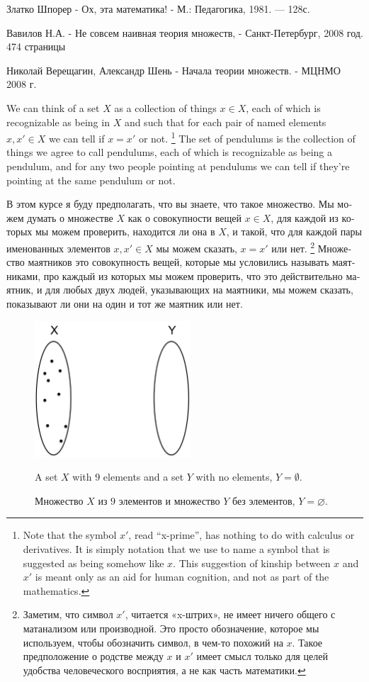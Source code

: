 \documentclass[a4paper]{book}
\theoremstyle{myth}
\begin{document}
\begin{russian}
{Златко Шпорер - Ох, эта математика! - М.: Педагогика, 1981. — 128с. 

Вавилов Н.А. - Не совсем наивная теория множеств, - Санкт-Петербург, 2008 год. 474 страницы
 
Николай Верещагин, Александр Шень - Начала теории множеств. - МЦНМО 2008 г.

} We can think of a set $X$ as a collection of things $x\in X$, each of which is recognizable as being in $X$ and such that for each pair of named elements $x,x'\in X$ we can tell if $x=x'$ or not.%
\footnote{Note that the symbol $x'$, read “x-prime”, has nothing to do with calculus or derivatives. It is simply notation that we use to name a symbol that is suggested as being somehow like $x$. This suggestion of kinship between $x$ and $x'$ is meant only as an aid for human cognition, and not as part of the mathematics.}
The set of pendulums is the collection of things we agree to call pendulums, each of which is recognizable as being a pendulum, and for any two people pointing at pendulums we can tell if they're pointing at the same pendulum or not. 

В этом курсе я буду предполагать, что вы знаете, что такое множество. Мы можем думать о множестве $X$ как о совокупности вещей $x\in X$, для каждой из которых мы можем проверить, находится ли она в $X$, и такой, что для каждой пары именованных элементов $x,x'\in X$ мы можем сказать, $x=x'$ или нет.%
\footnote{Заметим, что символ $x'$, читается «x-штрих», не имеет ничего общего с матанализом или производной. Это просто обозначение, которое мы используем, чтобы обозначить символ, в чем-то похожий на $x$. Такое предположение о родстве между $x$ и $x'$ имеет смысл только для целей удобства человеческого восприятия, а не как часть математики.}
Множество маятников это совокупность вещей, которые мы условились называть маятниками, про каждый из которых мы можем проверить, что это действительно маятник, и для любых двух людей, указывающих на маятники, мы можем сказать, показывают ли они на один и тот же маятник или нет. 

\begin{figure}
\begin{center}
\includegraphics[height=2in]{aSet}
\end{center}
\caption{A set $X$ with $9$ elements and a set $Y$ with no elements, $Y=\emptyset$.}
\caption{Множество $X$ из $9$ элементов и множество $Y$ без элементов, $Y=\varnothing$.}
\end{figure}


\end{russian}
\end{document}

